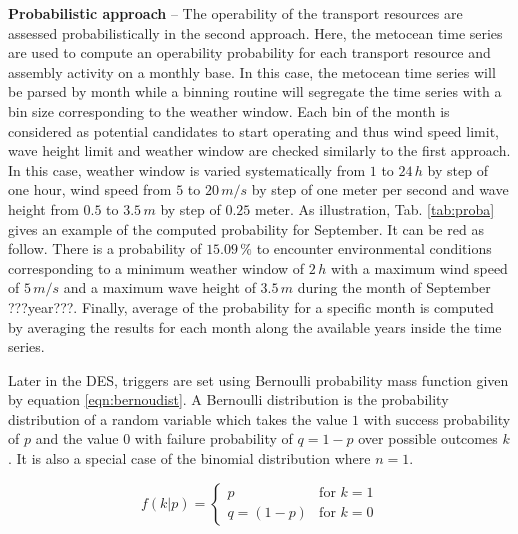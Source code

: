 \textbf{Probabilistic approach} -- The operability of the transport resources are assessed probabilistically in the second approach. Here, the metocean time series are used to compute an operability probability for each transport resource and assembly activity on a monthly base. In this case, the metocean time series will be parsed by month while a binning routine will segregate the time series with a bin size corresponding to the weather window. Each bin of the month is considered as potential candidates to start operating and thus wind speed limit, wave height limit and weather window are checked similarly to the first approach. In this case, weather window is varied systematically from $1$ to $24\, h$ by step of one hour, wind speed from $5$ to $20\, m/s$ by step of one meter per second and wave height from $0.5$ to $3.5\, m$ by step of $0.25$ meter. As illustration, Tab. \ref{tab:proba} gives an example of the computed probability for September. It can be red as follow. There is a probability of $15.09\, \%$ to encounter environmental conditions corresponding to a minimum weather window of $2\, h$ with a maximum wind speed of $5\, m/s$ and a maximum wave height of $3.5\, m$ during the month of September ???year???. Finally, average of the probability for a specific month is computed by averaging the results for each month along the available years inside the time series.


Later in the DES, triggers are set using Bernoulli probability mass function given by equation \ref{eqn:bernoudist}. A Bernoulli distribution is the probability distribution of a random variable which takes the value $1$ with success probability of $p$ and the value $0$ with failure probability of $q=1-p$ over possible outcomes $k$. It is also a special case of the binomial distribution where $n=1$.

\begin{equation}
\label{eqn:bernoudist}
f\left(k \vert p \right) = \begin{cases} p & \text{for $k=1$} \\ q=(1-p) & \text{for $k=0$} \end{cases}
\end{equation}

